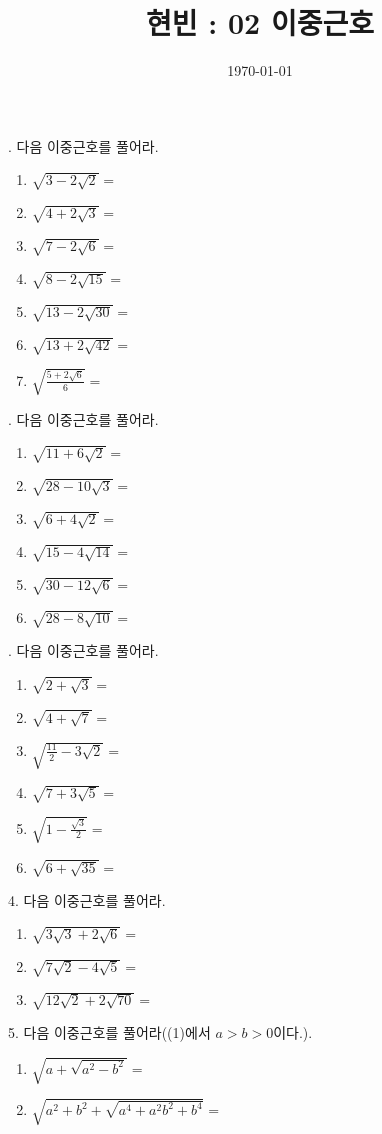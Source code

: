 \documentclass{article}
\begin{document}
\title{현빈 : 02 이중근호}
\author{}
\date{\today}
\maketitle

. 다음 이중근호를 풀어라.
\begin{enumerate}[(1)]
\item
\(\sqrt{3-2\sqrt2}=\)
\item
\(\sqrt{4+2\sqrt3}=\)
\item
\(\sqrt{7-2\sqrt6}=\)
\item
\(\sqrt{8-2\sqrt{15}}=\)
\item
\(\sqrt{13-2\sqrt{30}}=\)
\item
\(\sqrt{13+2\sqrt{42}}=\)
\item
\(\sqrt{\frac{5+2\sqrt6}6}=\)
\end{enumerate}

. 다음 이중근호를 풀어라.
\begin{enumerate}[(1)]
\item
\(\sqrt{11+6\sqrt2}=\)
\item
\(\sqrt{28-10\sqrt3}=\)
\item
\(\sqrt{6+4\sqrt2}=\)
\item
\(\sqrt{15-4\sqrt{14}}=\)
\item
\(\sqrt{30-12\sqrt6}=\)
\item
\(\sqrt{28-8\sqrt{10}}=\)
\end{enumerate}

. 다음 이중근호를 풀어라.
\begin{enumerate}[(1)]
\item
\(\sqrt{2+\sqrt3}=\)
\item
\(\sqrt{4+\sqrt7}=\)
\item
\(\sqrt{\frac{11}2-3\sqrt2}=\)
\item
\(\sqrt{7+3\sqrt5}=\)
\item
\(\sqrt{1-\frac{\sqrt3}2}=\)
\item
\(\sqrt{6+\sqrt{35}}=\)
\end{enumerate}

4. 다음 이중근호를 풀어라.
\begin{enumerate}[(1)]
\item
\(\sqrt{3\sqrt3+2\sqrt6}=\)
\item
\(\sqrt{7\sqrt2-4\sqrt5}=\)
\item
\(\sqrt{12\sqrt2+2\sqrt{70}}=\)
\end{enumerate}

5. 다음 이중근호를 풀어라((1)에서 \(a>b>0\)이다.).
\begin{enumerate}[(1)]
\item
\(\sqrt{a+\sqrt{a^2-b^2}}=\)
\item
\(\sqrt{a^2+b^2+\sqrt{a^4+a^2b^2+b^4}}=\)
\end{enumerate}
\end{document}

